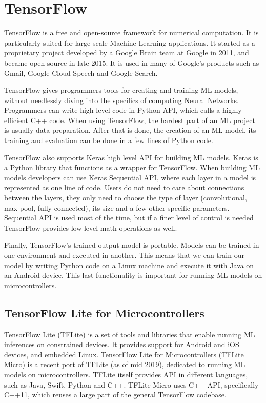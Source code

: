 \section{ TensorFlow}

TensorFlow is a free and open-source framework for numerical computation.
It is particularly suited for large-scale Machine Learning applications\cite{geron}.
It started as a proprietary project developed by a Google Brain team at Google in 2011, and became open-source in late 2015.
It is used in many of Google's products such as Gmail, Google Cloud Speech and Google Search.

TensorFlow gives programmers tools for creating and training ML models, without needlessly diving into the specifics of computing Neural Networks.
Programmers can write high level code in Python API, which calls a highly efficient C++ code.
When using TensorFlow, the hardest part of an ML project is usually data preparation.
After that is done, the creation of an ML model, its training and evaluation can be done in a few lines of Python code.

TensorFlow also supports Keras high level API for building ML models. 
Keras is a Python library that functions as a wrapper for TensorFlow.
When building ML models developers can use Keras Sequential API, where each layer in a model is represented as one line of code.
Users do not need to care about connections between the layers, they only need to choose the type of layer (convolutional, max pool, fully connected), its size and a few other specific parameters.
Sequential API is used most of the time, but if a finer level of control is needed TensorFlow provides low level math operations as well.

Finally, TensorFlow's trained output model is portable\cite{geron}.
Models can be trained in one environment and executed in another.
This means that we can train our model by writing Python code on a Linux machine and execute it with Java on an Android device.
This last functionality is important for running ML models on microcontrollers.

\subsection{ TensorFlow Lite for Microcontrollers} \label{tflite_quant}

TensorFlow Lite (TFLite) is a set of tools and libraries that enable running ML inferences on constrained devices\cite{tensorflow_github}.
It provides support for Android and iOS devices, and embedded Linux.
TensorFlow Lite for Microcontrollers (TFLite Micro) is a recent port of TFLite (as of mid 2019), dedicated to running ML models on microcontrollers.
TFLite itself provides API in different languages, such as Java, Swift, Python and C++.
TFLite Micro uses C++ API, specifically C++11, which reuses a large part of the general TensorFlow codebase.

